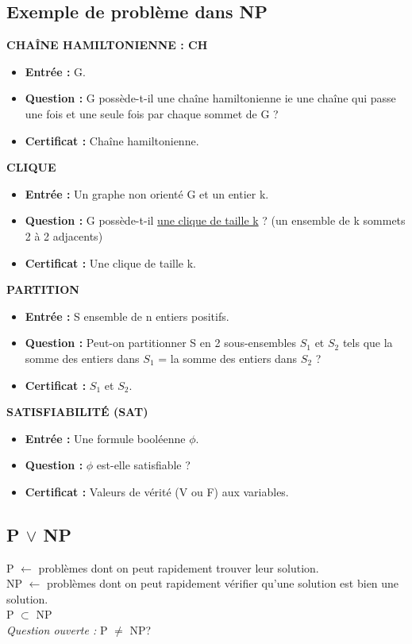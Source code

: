 \documentclass[12pt,a4paper]{article}
\begin{document}
\subsection{Exemple de problème dans NP}
\textbf{\Large CHAÎNE HAMILTONIENNE : CH}\\
\begin{itemize}
	\item \textbf{Entrée :} G.
	\item \textbf{Question :} G possède-t-il une chaîne hamiltonienne ie une chaîne qui passe une fois et une seule fois par chaque sommet de G ?
	\item \textbf{Certificat :} Chaîne hamiltonienne.\\
\end{itemize}
\textbf{\Large CLIQUE}\\
\begin{itemize}
	\item \textbf{Entrée :} Un graphe non orienté G et un entier k.
	\item \textbf{Question :} G possède-t-il \underline{une clique de taille k} ? (un ensemble de k sommets 2 à 2 adjacents)
	\item \textbf{Certificat :} Une clique de taille k.\\
\end{itemize}
\textbf{\Large PARTITION}\\
\begin{itemize}
	\item \textbf{Entrée :} S ensemble de n entiers positifs.
	\item \textbf{Question :} Peut-on partitionner S en 2 sous-ensembles $S_1$ et $S_2$ tels que la somme des entiers dans $S_1$ = la somme des entiers dans $S_2$ ?
	\item \textbf{Certificat :} $S_1$ et $S_2$.\\
\end{itemize}
\textbf{\Large SATISFIABILITÉ (SAT)}\\
\begin{itemize}
	\item \textbf{Entrée :} Une formule booléenne $\phi$.
	\item \textbf{Question :} $\phi$ est-elle satisfiable ?
	\item \textbf{Certificat :} Valeurs de vérité (V ou F) aux variables.\\
\end{itemize}
\subsection{P $\lor$ NP}
P $\leftarrow$ problèmes dont on peut rapidement trouver leur solution.\\
NP $\leftarrow$ problèmes dont on peut rapidement vérifier qu'une solution est bien une solution.\\
P $\subset$ NP\\
\textit{Question ouverte : } P $\neq$ NP?
\end{document}
